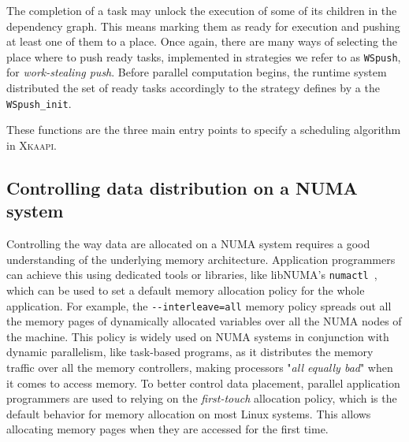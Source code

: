 \documentclass{Styles/llncs}
\newcommand{\kaapi}{\textsc{\mbox{Xkaapi}}\xspace}
\begin{document}
The completion of a task may unlock the execution of some of its children in the dependency graph.
This means marking them as ready for execution and pushing at least one of them to a place.
Once again, there are many ways of selecting the place where to push ready tasks, implemented in strategies we refer to as \verb/WSpush/, for \emph{work-stealing push}.
Before parallel computation begins, the runtime system distributed the set of ready tasks accordingly  to the strategy defines by a the \verb/WSpush_init/.

These functions are the three main entry points to specify a scheduling algorithm in \kaapi. 

\subsection{Controlling data distribution on a NUMA system}

Controlling the way data are allocated on a NUMA system requires a good understanding of the underlying memory architecture.
Application programmers can achieve this using dedicated tools or libraries, like libNUMA's \verb!numactl!~\cite{DBLP:journals/corr/abs-1101-0093}, which can be used to set a default memory allocation policy for the whole application.
For example, the \verb!--interleave=all! memory policy spreads out all the memory pages of dynamically allocated variables over all the NUMA nodes of the machine.
This policy is widely used on NUMA systems in conjunction with dynamic parallelism, like task-based programs, as it distributes the memory traffic over all the memory controllers, making processors "\emph{all equally bad}" when it comes to access memory.
To better control data placement, parallel application programmers are used to relying on the \emph{first-touch} allocation policy, which is the default behavior for memory allocation on most Linux systems.
This allows allocating memory pages when they are accessed for the first time.
\end{document}

